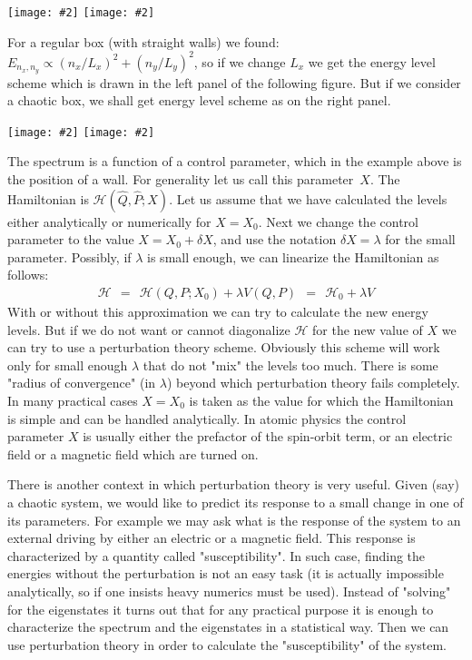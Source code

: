 \documentclass[onecolumn,fleqn]{revtex4}
\newcommand{\putgraph}[2][0.30\hsize]{\texttt{[image: \#2]}}
\newcommand{\putgraphr}[2][0.30\hsize]{\texttt{[image: \#2]}}
\newcommand{\beq}{\begin{eqnarray}}
\newcommand{\eeq}{\end{eqnarray}}
\begin{document}
\begin{center}
\putgraph[0.2\hsize]{BoxWithCrookedWall} 
\hspace*{0.2\hsize}
\putgraph[0.2\hsize]{ChaoticBox}
\end{center}

For a regular box (with straight walls) we found: 
${ E_{n_x,n_y} \propto (n_x/L_x)^2 + (n_y/L_y)^2 }$, 
so if we change $L_x$ we get the energy level scheme  
which is drawn in the left panel of the following figure. 
But if we consider a chaotic box, we shall get 
energy level scheme as on the right panel.  

\begin{center}
\putgraphr{RegularBoxMovingWallEnergyLevels} 
\hspace*{0.2\hsize}
\putgraphr{CrookedBoxMovingWallEnergyLevels} 
\end{center}

The spectrum is a function of a control parameter, 
which in the example above is the position of a wall. 
For generality let us call this parameter~$X$. 
The Hamiltonian is $\mathcal{H}(\hat{Q},\hat{P};X)$. 
Let us assume that we have calculated the levels 
either analytically or numerically for $X=X_0$. 
Next we change the control parameter to the 
value ${X=X_0+\delta X}$, and use the 
notation $\delta X=\lambda$ for the small parameter.   
Possibly, if $\lambda$ is small enough, we can linearize 
the Hamiltonian as follows:
\beq
\mathcal{H} \ \ = \ \  
\mathcal{H}(Q,P;X_0) + \lambda V(Q,P)
\ \ = \ \ \mathcal{H}_0 + \lambda V
\eeq 
With or without this approximation we can try  
to calculate the new energy levels. 
But if we do not want or cannot diagonalize $\mathcal{H}$ 
for the new value of $X$ we can try to 
use a perturbation theory scheme. Obviously 
this scheme will work only for small enough $\lambda$ 
that do not "mix" the levels too much.
There is some "radius of convergence" (in $\lambda$) 
beyond which perturbation theory fails completely.
In many practical cases $X=X_0$ is 
taken as the value for which the Hamiltonian is simple 
and can be handled analytically. In atomic physics 
the control parameter $X$ is usually either 
the prefactor of the spin-orbit term, or an 
electric field or a magnetic field which are turned on.   


There is another context in which perturbation theory 
is very useful. Given (say) a chaotic system, 
we would like to predict its response to a small change 
in one of its parameters. For example we may ask  
what is the response of the system to an external 
driving by either an electric or a magnetic field. 
This response is characterized by a quantity called "susceptibility". 
In such case, finding the energies without the perturbation 
is not an easy task (it is actually impossible analytically, 
so if one insists heavy numerics must be used). 
Instead of "solving" for the eigenstates it turns out 
that for any practical purpose it is enough to characterize 
the spectrum and the eigenstates in a statistical 
way. Then we can use perturbation theory in order 
to calculate the "susceptibility" of the system. 
\end{document}
